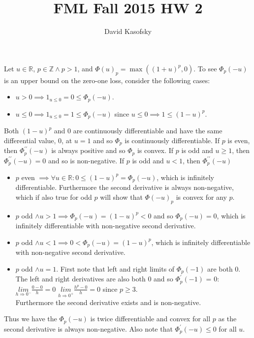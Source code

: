 \documentclass[]{article}
\title{FML Fall 2015 HW 2}
\author{David Kasofsky}
\begin{document}
\section{}
\subsection{}

Let $u \in \mathbb{R}$, $p \in \mathbb{Z} \land p > 1$, and $\Phi(u)_p = \max((1+u)^p, 0)$. To see $\Phi_p(-u)$ is an upper bound on the zero-one loss, consider the following cases:

\begin{itemize}
\item $u > 0 \implies 1_{u \le 0} = 0 \le \Phi_p(-u)$.
\item $u \le 0 \implies 1_{u \le 0} = 1 \le \Phi_p(-u)$ since $u \le 0 \implies 1 \le (1-u)^p$.
\end{itemize}

\noindent Both $(1-u)^p$ and 0 are continuously differentiable and have the same differential value, 0, at $u = 1$ and so $\Phi_p$ is continuously differentiable. If $p$ is even, then $\Phi_p^{\prime \prime}(-u)$ is always positive and so $\Phi_p$ is convex. If $p$ is odd and $u \ge 1$, then $\Phi_p^{\prime \prime}(-u) = 0$ and so is non-negative. If $p$ is odd and $u < 1$, then $\Phi_p^{\prime \prime}(-u) $

\begin{itemize}
	\item $p$ even $\implies \forall u \in \mathbb{R}: 0 \le (1-u)^p = \Phi_p(-u)$, which is infinitely differentiable. Furthermore the second derivative is always non-negative, which if also true for odd $p$ will show that $\Phi(-u)_p$ is convex for any $p$.
	\item $p$ odd $\land u > 1 \implies \Phi_p(-u) = (1- u)^p < 0$ and so $\Phi_p(-u) = 0$, which is infinitely differentiable with non-negative second derivative.
	\item $p$ odd $\land u < 1 \implies 0 < \Phi_p(-u) = (1-u)^p$, which is infinitely differentiable with non-negative second derivative.
	\item $p$ odd $\land u = 1$. First note that left and right limits of $\Phi_p(-1)$ are both 0. The left and right derivatives are also both 0 and so $\Phi_p^\prime(-1)$ = 0:
	\subitem $\underset{h \Rightarrow 0^-}{lim}\frac{0 - 0}{h} = 0$
	\subitem$ \underset{h \Rightarrow 0^+}{lim}\frac{h^p - 0}{h} = 0$ since $p \ge 3$.\\
	Furthermore the second derivative exists and is non-negative.
\end{itemize}
\noindent Thus we have the $\Phi_p(-u)$ is twice differentiable and convex for all $p$ as the second derivative is always non-negative. Also note that $\Phi_p^\prime(-u) \le 0$ for all $u$.	
\end{document}
